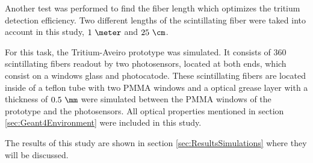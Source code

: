 Another test was performed to find the fiber length which optimizes the tritium detection efficiency. Two different lengths of the scintillating fiber were taked into account in this study, $1~\meter$ and $25~\cm$. 

For this task, the Tritium-Aveiro prototype was simulated. It consists of $360$ scintillating fibers readout by two photosensors, located at both ends, which consist on a windows glass and photocatode. These scintillating fibers are located inside of a teflon tube with two PMMA windows and a optical grease layer with a thickness of $0.5~\mm$ were simulated between the PMMA windows of the prototype and the photosensors. All optical properties mentioned in section \ref{sec:Geant4Environment} were included in this study.

The results of this study are shown in section \ref{sec:ResultsSimulations} where they will be discussed.